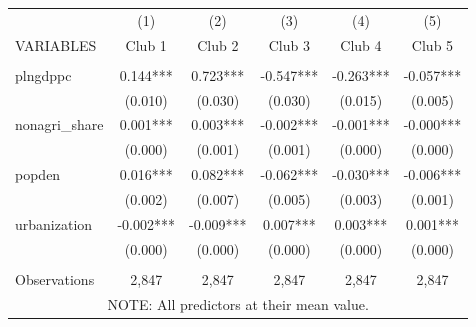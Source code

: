 \begin{tabular}{lccccc} \hline
 & (1) & (2) & (3) & (4) & (5) \\
VARIABLES & Club 1 & Club 2 & Club 3 & Club 4 & Club 5 \\ \hline
 &  &  &  &  &  \\
plngdppc & 0.144*** & 0.723*** & -0.547*** & -0.263*** & -0.057*** \\
 & (0.010) & (0.030) & (0.030) & (0.015) & (0.005) \\
nonagri\_share & 0.001*** & 0.003*** & -0.002*** & -0.001*** & -0.000*** \\
 & (0.000) & (0.001) & (0.001) & (0.000) & (0.000) \\
popden & 0.016*** & 0.082*** & -0.062*** & -0.030*** & -0.006*** \\
 & (0.002) & (0.007) & (0.005) & (0.003) & (0.001) \\
urbanization & -0.002*** & -0.009*** & 0.007*** & 0.003*** & 0.001*** \\
 & (0.000) & (0.000) & (0.000) & (0.000) & (0.000) \\
 &  &  &  &  &  \\
 Observations & 2,847 & 2,847 & 2,847 & 2,847 & 2,847 \\ \hline
\multicolumn{6}{c}{ NOTE: All predictors at their mean value.} \\
\end{tabular}
